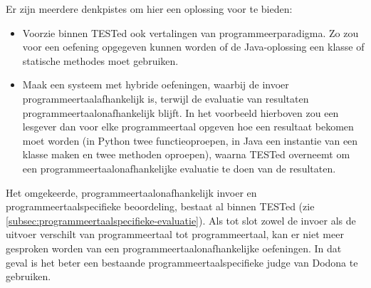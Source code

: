 Er zijn meerdere denkpistes om hier een oplossing voor te bieden:

\begin{itemize}
    \item Voorzie binnen TESTed ook vertalingen van programmeerparadigma.
    Zo zou voor een oefening opgegeven kunnen worden of de Java-oplossing een klasse of statische methodes moet gebruiken.
    \item Maak een systeem met hybride oefeningen, waarbij de invoer programmeertaalafhankelijk is, terwijl de evaluatie van resultaten programmeertaalonafhankelijk blijft.
    In het voorbeeld hierboven zou een lesgever dan voor elke programmeertaal opgeven hoe een resultaat bekomen moet worden (in Python twee functieoproepen, in Java een instantie van een klasse maken en twee methoden oproepen), waarna TESTed overneemt om een programmeertaalonafhankelijke evaluatie te doen van de resultaten.
\end{itemize}

Het omgekeerde, programmeertaalonafhankelijk invoer en programmeertaalspecifieke beoordeling, bestaat al binnen TESTed (zie \cref{subsec:programmeertaalspecifieke-evaluatie}).
Als tot slot zowel de invoer als de uitvoer verschilt van programmeertaal tot programmeertaal, kan er niet meer gesproken worden van een programmeertaalonafhankelijke oefeningen.
In dat geval is het beter een bestaande programmeertaalspecifieke judge van Dodona te gebruiken.

